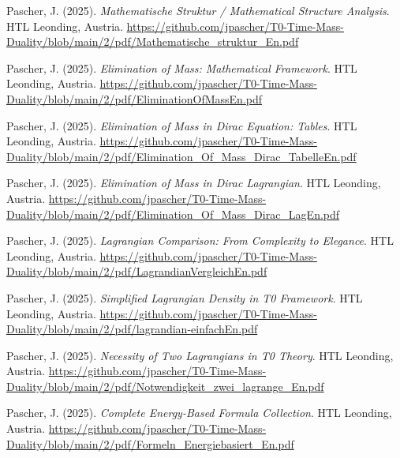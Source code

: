\documentclass{article}
\begin{document}
\begin{thebibliography}{99}
		Pascher, J. (2025).
		\textit{Mathematische Struktur / Mathematical Structure Analysis}.
		HTL Leonding, Austria.
		\url{https://github.com/jpascher/T0-Time-Mass-Duality/blob/main/2/pdf/Mathematische_struktur_En.pdf}
		
		Pascher, J. (2025).
		\textit{Elimination of Mass: Mathematical Framework}.
		HTL Leonding, Austria.
		\url{https://github.com/jpascher/T0-Time-Mass-Duality/blob/main/2/pdf/EliminationOfMassEn.pdf}
		
		Pascher, J. (2025).
		\textit{Elimination of Mass in Dirac Equation: Tables}.
		HTL Leonding, Austria.
		\url{https://github.com/jpascher/T0-Time-Mass-Duality/blob/main/2/pdf/Elimination_Of_Mass_Dirac_TabelleEn.pdf}
		
		Pascher, J. (2025).
		\textit{Elimination of Mass in Dirac Lagrangian}.
		HTL Leonding, Austria.
		\url{https://github.com/jpascher/T0-Time-Mass-Duality/blob/main/2/pdf/Elimination_Of_Mass_Dirac_LagEn.pdf}
		
		
		Pascher, J. (2025).
		\textit{Lagrangian Comparison: From Complexity to Elegance}.
		HTL Leonding, Austria.
		\url{https://github.com/jpascher/T0-Time-Mass-Duality/blob/main/2/pdf/LagrandianVergleichEn.pdf}
		
		Pascher, J. (2025).
		\textit{Simplified Lagrangian Density in T0 Framework}.
		HTL Leonding, Austria.
		\url{https://github.com/jpascher/T0-Time-Mass-Duality/blob/main/2/pdf/lagrandian-einfachEn.pdf}
		
		Pascher, J. (2025).
		\textit{Necessity of Two Lagrangians in T0 Theory}.
		HTL Leonding, Austria.
		\url{https://github.com/jpascher/T0-Time-Mass-Duality/blob/main/2/pdf/Notwendigkeit_zwei_lagrange_En.pdf}
		
		Pascher, J. (2025).
		\textit{Complete Energy-Based Formula Collection}.
		HTL Leonding, Austria.
		\url{https://github.com/jpascher/T0-Time-Mass-Duality/blob/main/2/pdf/Formeln_Energiebasiert_En.pdf}
		
		

\end{thebibliography}
\end{document}
